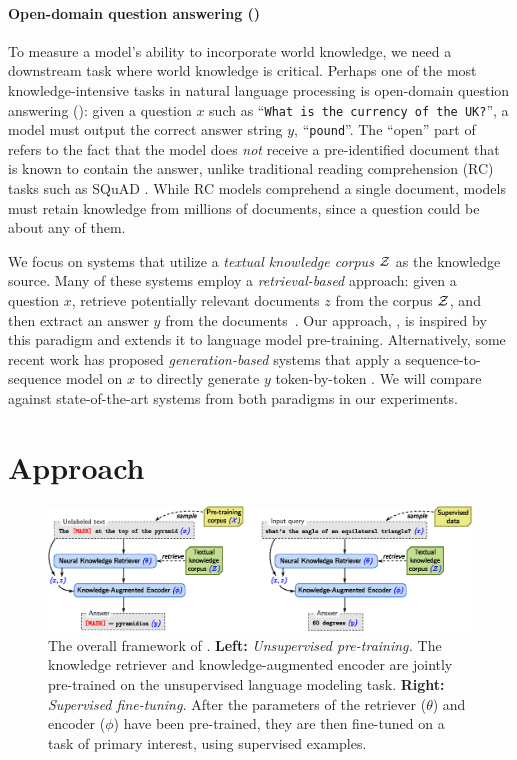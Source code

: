 \documentclass{article}
\begin{document}
\paragraph{Open-domain question answering (\openqa)}
To measure a model's ability to incorporate world knowledge, we need a downstream task where world knowledge is critical.
Perhaps one of the most knowledge-intensive tasks in natural language processing is open-domain question answering (\openqa):
given a question $x$ such as ``\texttt{\small What is the currency of the UK?}'', a model must output the correct answer string $y$, ``\texttt{{\small pound}}''.
The ``open'' part of \openqa refers to the fact that the model does {\em not} receive a pre-identified document that is known to contain the answer, unlike traditional reading comprehension (RC) tasks such as SQuAD \cite{squad, squad2}. While RC models comprehend a single document, \openqa models must retain knowledge from millions of documents, since a question could be about any of them.

We focus on \openqa systems that utilize a \emph{textual knowledge corpus} $\mathcal{Z}$ as the knowledge source.
Many of these systems employ a \emph{retrieval-based} approach:
given a question $x$, retrieve potentially relevant documents $z$ from the corpus $\mathcal{Z}$,
and then extract an answer $y$ from the documents~\cite{askmsr,drqa,orqa}.
Our approach, \thename, is inspired by this paradigm and extends it to language model pre-training.
Alternatively, some recent work has proposed \emph{generation-based} systems that
apply a sequence-to-sequence model on $x$ to directly generate $y$ token-by-token
\cite{bart_not_bert,t5}.
We will compare against state-of-the-art systems from both paradigms in our experiments. \section{Approach} \label{sec:approach}
\begin{figure}[t!]
\centering
\includegraphics[width=.9\textwidth]{figures/pretrain_finetune.eps}
\caption{The overall framework of \thename. {\bf Left:} {\em Unsupervised pre-training.} The knowledge retriever and knowledge-augmented encoder are jointly pre-trained on the unsupervised language modeling task. 
{\bf Right:} {\em Supervised fine-tuning.} After the parameters of the retriever ($\theta$) and encoder ($\phi$) have been pre-trained, they are then fine-tuned on a task of primary interest, using supervised examples.}
\label{fig:approach}
\end{figure}
\end{document}
